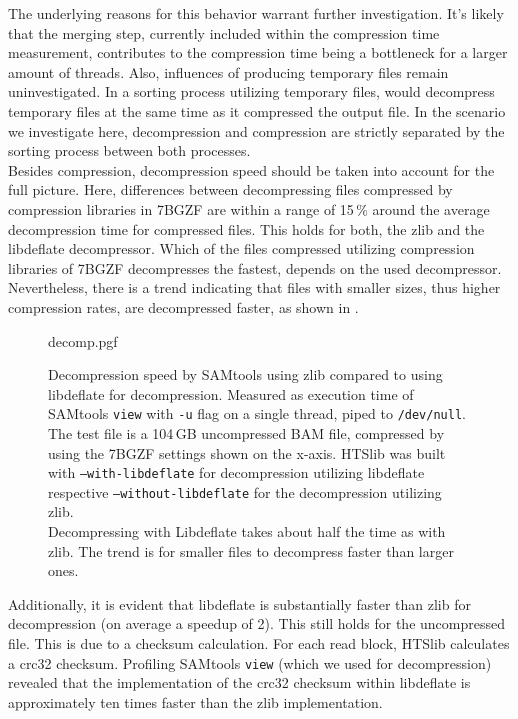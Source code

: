The underlying reasons for this behavior warrant further investigation. It's likely that the merging step, currently included within the compression time measurement, contributes to the compression time being a bottleneck for a larger amount of threads. 
Also, influences of \sort producing temporary files remain uninvestigated. In a sorting process utilizing temporary files, \sort would decompress temporary files at the same time as it compressed the output file. In the scenario we investigate here, decompression and compression are strictly separated by the sorting process between both processes.\\


Besides compression, decompression speed should be taken into account for the full picture. Here, differences between decompressing files compressed by compression libraries in 7BGZF are within a range of 15\,\% around the average decompression time for compressed files. This holds for both, the zlib and the libdeflate decompressor.
Which of the files compressed utilizing compression libraries of 7BGZF decompresses the fastest, depends on the used decompressor. Nevertheless, there is a trend indicating that files with smaller sizes, thus higher compression rates, are decompressed faster, as shown in .
\begin{figure}[htb]
        {decomp.pgf}
    \caption{Decompression speed by SAMtools using zlib compared to using libdeflate for decompression. Measured as execution time of SAMtools \texttt{view} with \texttt{-u} flag on a single thread, piped to \texttt{/dev/null}. The test file is a 104\,GB uncompressed BAM file, compressed by \sort using the 7BGZF settings shown on the x-axis. \parents \threads \points HTSlib was built with \texttt{--with-libdeflate} for decompression utilizing libdeflate respective \texttt{--without-libdeflate} for the decompression utilizing zlib.\\
    Decompressing with Libdeflate takes about half the time as with zlib. The trend is for smaller files to decompress faster than larger ones.}
    \label{fig:decomp}
\end{figure}

 
Additionally, it is evident that libdeflate is substantially faster than zlib for decompression (on average a speedup of 2). This still holds for the uncompressed file. This is due to a checksum calculation. For each read block, HTSlib calculates a crc32 checksum. Profiling SAMtools \texttt{view} (which we used for decompression) revealed that the implementation of the crc32 checksum within libdeflate is approximately ten times faster than the zlib implementation.\\

